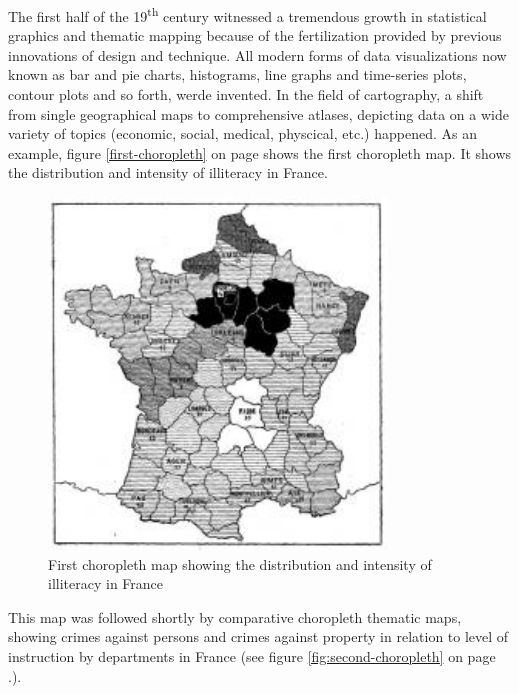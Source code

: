 The first half of the 19\textsuperscript{th} century witnessed a tremendous growth in statistical graphics and thematic mapping because of the fertilization provided by previous innovations of design and technique. All modern forms of data visualizations now known as bar and pie charts, histograms, line graphs and time-series plots, contour plots and so forth, werde invented. In the field of cartography, a shift from single geographical maps to comprehensive atlases, depicting data on a wide variety of topics (economic, social, medical, physcical, etc.) happened. As an example, figure \ref{first-choropleth} on page \pageref{first-choropleth} shows the first choropleth map. It shows the distribution and intensity of illiteracy in France.

\begin{figure}[h]
\centering
\includegraphics[width=0.8\textwidth,keepaspectratio]{images/history/dupin.jpg}
\caption[
    First choropleth map showing the distribution and intensity of illiteracy in France, Urldate: 07.2016 \newline
\small\texttt{\url{http://datavis.ca/milestones//admin/uploads/images/dupin.gif}}
]{First choropleth map showing the distribution and intensity of illiteracy in France}
\label{fig:first-choropleth}
\end{figure}

This map was followed shortly by comparative choropleth thematic maps, showing crimes against persons and crimes against property in relation to level of instruction by departments in France (see figure \ref{fig:second-choropleth} on page \pageref{fig:second-choropleth}.).

